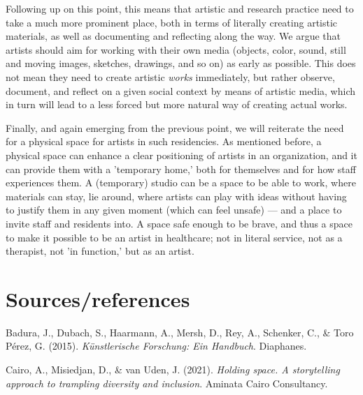 \documentclass[authordate, empirical]{jote-new-article}
\begin{document}
	Following up on this point, this means that artistic and research practice need to take a much more prominent place, both in terms of literally creating artistic materials, as well as documenting and reflecting along the way. We argue that artists should aim for working with their own media (objects, color, sound, still and moving images, sketches, drawings, and so on) as early as possible. This does not mean they need to create artistic \emph{works} immediately, but rather observe, document, and reflect on a given social context by means of artistic media, which in turn will lead to a less forced but more natural way of creating actual works.







	Finally, and again emerging from the previous point, we will reiterate the need for a physical space for artists in such residencies. As mentioned before, a physical space can enhance a clear positioning of artists in an organization, and it can provide them with a 'temporary home,' both for themselves and for how staff experiences them. A (temporary) studio can be a space to be able to work, where materials can stay, lie around, where artists can play with ideas without having to justify them in any given moment (which can feel unsafe) — and a place to invite staff and residents into. A space safe enough to be brave, and thus a space to make it possible to be an artist in healthcare; not in literal service, not as a therapist, not 'in function,' but as an artist.



	\section{Sources/references}



	Badura, J., Dubach, S., Haarmann, A., Mersh, D., Rey, A., Schenker, C., \& Toro Pérez, G. (2015). \emph{Künstlerische Forschung: Ein Handbuch}. Diaphanes.







	Cairo, A., Misiedjan, D., \& van Uden, J. (2021). \emph{Holding space. A storytelling approach to trampling diversity and inclusion}. Aminata Cairo Consultancy.
\end{document}
